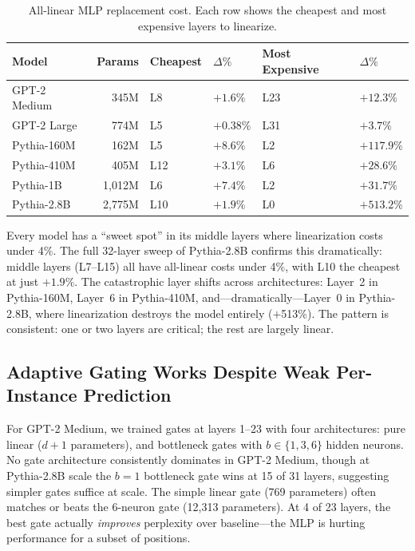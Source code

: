 \documentclass[11pt]{article}
\begin{document}
\begin{table}[t]
\centering
\caption{All-linear MLP replacement cost. Each row shows the cheapest and most expensive layers to linearize.}
\label{tab:alllinear}
\begin{tabular}{lrllll}
\toprule
Model & Params & Cheapest & $\Delta\%$ & Most Expensive & $\Delta\%$ \\
\midrule
GPT-2 Medium & 345M & L8 & $+1.6\%$ & L23 & $+12.3\%$ \\
GPT-2 Large & 774M & L5 & $+0.38\%$ & L31 & $+3.7\%$ \\
Pythia-160M & 162M & L5 & $+8.6\%$ & L2 & $+117.9\%$ \\
Pythia-410M & 405M & L12 & $+3.1\%$ & L6 & $+28.6\%$ \\
Pythia-1B & 1,012M & L6 & $+7.4\%$ & L2 & $+31.7\%$ \\
Pythia-2.8B & 2,775M & L10 & $+1.9\%$ & L0 & $+513.2\%$ \\
\bottomrule
\end{tabular}
\end{table}

Every model has a ``sweet spot'' in its middle layers where linearization costs under 4\%. The full 32-layer sweep of Pythia-2.8B confirms this dramatically: middle layers (L7--L15) all have all-linear costs under 4\%, with L10 the cheapest at just $+1.9\%$. The catastrophic layer shifts across architectures: Layer~2 in Pythia-160M, Layer~6 in Pythia-410M, and---dramatically---Layer~0 in Pythia-2.8B, where linearization destroys the model entirely ($+$513\%). The pattern is consistent: one or two layers are critical; the rest are largely linear.

\subsection{Adaptive Gating Works Despite Weak Per-Instance Prediction}

For GPT-2 Medium, we trained gates at layers 1--23 with four architectures: pure linear ($d + 1$ parameters), and bottleneck gates with $b \in \{1, 3, 6\}$ hidden neurons. No gate architecture consistently dominates in GPT-2 Medium, though at Pythia-2.8B scale the $b{=}1$ bottleneck gate wins at 15 of 31 layers, suggesting simpler gates suffice at scale. The simple linear gate (769 parameters) often matches or beats the 6-neuron gate (12,313 parameters). At 4 of 23 layers, the best gate actually \textit{improves} perplexity over baseline---the MLP is hurting performance for a subset of positions.
\end{document}
